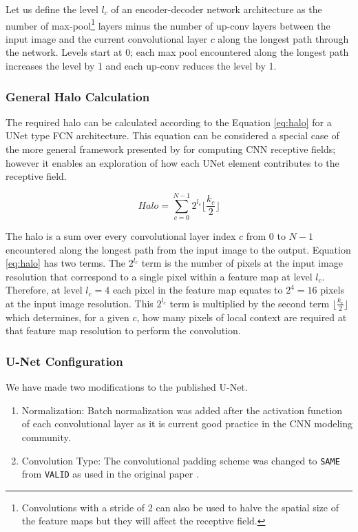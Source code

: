 \documentclass[10pt, indentfirst]{article}
\begin{document}
Let us define the level $l_{c}$ of an encoder-decoder network architecture as the number of max-pool\footnote{Convolutions with a stride of 2 can also be used to halve the spatial size of the feature maps but they will affect the receptive field.} layers minus the number of up-conv layers between the input image and the current convolutional layer $c$ along the longest path through the network. Levels start at 0; each max pool encountered along the longest path increases the level by 1 and each up-conv reduces the level by 1. 


\subsubsection{General Halo Calculation}

The required halo can be calculated according to the Equation \ref{eq:halo} for a UNet type FCN architecture. This equation can be considered a special case of the more general framework presented by \cite{araujo2019computing} for computing CNN receptive fields; however it enables an exploration of how each UNet element contributes to the receptive field. 

\begin{equation}
Halo = \sum_{c=0}^{N-1} 2^{l_c} \lfloor \frac{k_c}{2} \rfloor
\label{eq:halo}
\end{equation}

The halo is a sum over every convolutional layer index $c$ from $0$ to $N-1$ encountered along the longest path from the input image to the output. 
Equation \ref{eq:halo} has two terms. The $2^{l_c}$ term is the number of pixels at the input image resolution that correspond to a single pixel within a feature map at level $l_c$. 
Therefore, at level $l_c=4$ each pixel in the feature map equates to $2^4 = 16$ pixels at the input image resolution. This $2^{l_c}$ term is multiplied by the second term $\lfloor \frac{k_c}{2} \rfloor$ which determines, for a given $c$, how many pixels of local context are required at that feature map resolution to perform the convolution.

\subsubsection{U-Net Configuration}

We have made two modifications to the published U-Net. 

\begin{enumerate}
	\item Normalization: Batch normalization \citep{ioffe2015batch} was added after the activation function of each convolutional layer as it is current good practice in the CNN modeling community. 
	\item Convolution Type: The convolutional padding scheme was changed to \texttt{SAME} from \texttt{VALID} as used in the original paper \citep{Ronneberger2015a}.
\end{enumerate} 
\end{document}
